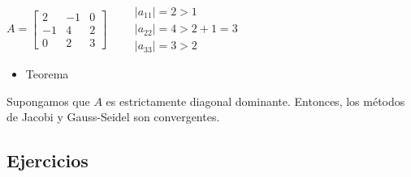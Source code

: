 $A=\begin{bmatrix}
	2 & -1 & 0\\
	-1 & 4 & 2\\
	0 & 2 & 3
\end{bmatrix}\qquad\begin{array}{l}
|a_{11}|=2>1\\
|a_{22}|=4>2+1=3\\
|a_{33}|=3>2
\end{array}$
\begin{itemize}[label=\color{red}\textbullet, leftmargin=*]
	\item \color{lightblue}Teorema
\end{itemize}
Supongamos que $A$ es estrictamente diagonal dominante. Entonces, los métodos de Jacobi y Gauss-Seidel son convergentes.
\subsection{Ejercicios}
